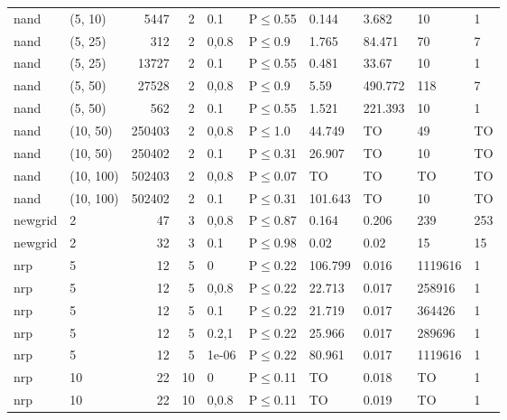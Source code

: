 \begin{longtable}{llrrllllll}
 nand          & (5, 10)   &   	5447 &   2 & 0.1   & P$\leq$0.55  & 0.144   & 3.682   & 10      & 1    \\
 nand          & (5, 25)   &    	312 &   2 & 0,0.8 & P$\leq$0.9   & 1.765   & 84.471  & 70      & 7    \\
 nand          & (5, 25)   &  	13727 &   2 & 0.1   & P$\leq$0.55  & 0.481   & 33.67   & 10      & 1    \\
 nand          & (5, 50)   &  	27528 &   2 & 0,0.8 & P$\leq$0.9   & 5.59    & 490.772 & 118     & 7    \\
 nand          & (5, 50)   &    	562 &   2 & 0.1   & P$\leq$0.55  & 1.521   & 221.393 & 10      & 1    \\
 nand          & (10, 50)  & 	250403 &   2 & 0,0.8 & P$\leq$1.0   & 44.749  & TO      & 49      & TO   \\
 nand          & (10, 50)  & 	250402 &   2 & 0.1   & P$\leq$0.31  & 26.907  & TO      & 10      & TO   \\
 nand          & (10, 100) & 	502403 &   2 & 0,0.8 & P$\leq$0.07  & TO      & TO      & TO      & TO   \\
 nand          & (10, 100) & 	502402 &   2 & 0.1   & P$\leq$0.31  & 101.643 & TO      & 10      & TO   \\
 newgrid       & 2         &     	47 &   3 & 0,0.8 & P$\leq$0.87  & 0.164   & 0.206   & 239     & 253  \\
 newgrid       & 2         &     	32 &   3 & 0.1   & P$\leq$0.98  & 0.02    & 0.02    & 15      & 15   \\
 nrp           & 5         &     	12 &   5 & 0     & P$\leq$0.22  & 106.799 & 0.016   & 1119616 & 1    \\
 nrp           & 5         &     	12 &   5 & 0,0.8 & P$\leq$0.22  & 22.713  & 0.017   & 258916  & 1    \\
 nrp           & 5         &     	12 &   5 & 0.1   & P$\leq$0.22  & 21.719  & 0.017   & 364426  & 1    \\
 nrp           & 5         &     	12 &   5 & 0.2,1 & P$\leq$0.22  & 25.966  & 0.017   & 289696  & 1    \\
 nrp           & 5         &     	12 &   5 & 1e-06 & P$\leq$0.22  & 80.961  & 0.017   & 1119616 & 1    \\
 nrp           & 10        &     	22 &  10 & 0     & P$\leq$0.11  & TO      & 0.018   & TO      & 1    \\
 nrp           & 10        &     	22 &  10 & 0,0.8 & P$\leq$0.11  & TO      & 0.019   & TO      & 1    \\

\end{longtable}

